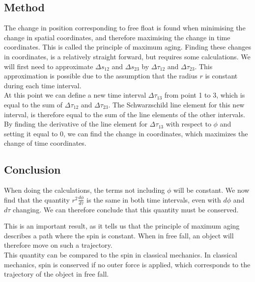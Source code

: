 \documentclass[reprint,english,notitlepage]{revtex4-2}
\begin{document}
    \subsection{Method}\label{subsec:method2}
        The change in position corresponding to free float is found when minimising the change in spatial coordinates, and therefore maximising the change in time coordinates.
        This is called the principle of maximum aging.
        Finding these changes in coordinates, is a relatively straight forward, but requires some calculations.
        We will first need to approximate $\Delta s_{12}$ and $\Delta s_{23}$ by $\Delta \tau_{12}$ and $\Delta \tau_{23}$.
        This approximation is possible due to the assumption that the radius $r$ is constant during each time interval.\\

        At this point we can define a new time interval $\Delta \tau_{13}$ from point 1 to 3, which is equal to the sum of $\Delta \tau_{12}$ and $\Delta\tau_{23}$.
        The Schwarzschild line element for this new interval, is therefore equal to the sum of the line elements of the other intervals.\\

        By finding the derivative of the line element for $\Delta \tau_{13}$ with respect to $\phi$ and setting it equal to 0, we can find the change in coordinates, which maximizes the change of time coordinates.

    \subsection{Conclusion}\label{subsec:conclusion2}
        When doing the calculations, the terms not including $\phi$ will be constant.
        We now find that the quantity $r^2 \frac{d\phi}{d\tau}$ is the same in both time intervals, even with $d\phi$ and $d\tau$ changing.
        We can therefore conclude that this quantity must be conserved.

        This is an important result, as it tells us that the principle of maximum aging describes a path where the spin is constant.
        When in free fall, an object will therefore move on such a trajectory.\\

        This quantity can be compared to the spin in classical mechanics.
        In classical mechanics, spin is conserved if no outer force is applied, which corresponds to the trajectory of the object in free fall.
\end{document}
